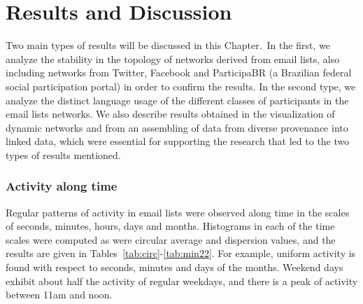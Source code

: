 \chapter{Results and Discussion}
\label{ch:disc}

Two main types of results will be discussed in this Chapter. In the first, we analyze the stability in the topology of networks derived from email lists, also including networks from Twitter, Facebook and ParticipaBR (a Brazilian federal social participation portal) in order to confirm the results. In the second type, we analyze the distinct language usage of the different classes of participants in the email lists networks.
We also describe results obtained in the visualization of dynamic networks
and from an assembling of data from diverse provenance into linked data, which were essential for supporting the research that led to the two types of results mentioned.


\subsection{Activity along time}\label{constDisc}
Regular patterns of activity in email lists were observed along time
in the scales of seconds, minutes, hours, days and months.
Histograms in each of the time scales were computed as were circular average and dispersion values, and the results are given in Tables~\ref{tab:circ}-\ref{tab:min22}. For example, uniform activity is found with respect to seconds, minutes and days of the months. Weekend days exhibit about half the activity of regular weekdays, and there is a peak of activity between 11am and noon.


